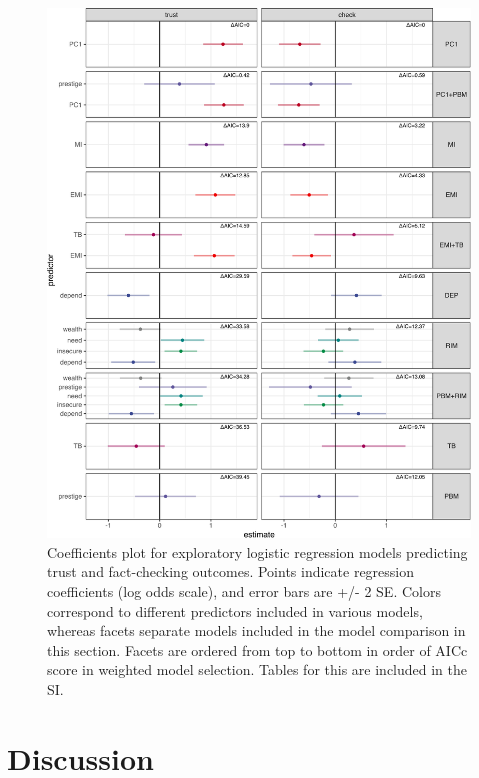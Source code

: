 \documentclass[
  11pt,
]{article}
\begin{document}
\begin{figure}
\centering
\includegraphics{trust-advice-writeup_files/figure-latex/single_coefficients_plot-1.pdf}
\caption{Coefficients plot for exploratory logistic regression models
predicting trust and fact-checking outcomes. Points indicate regression
coefficients (log odds scale), and error bars are +/- 2 SE. Colors
correspond to different predictors included in various models, whereas
facets separate models included in the model comparison in this section.
Facets are ordered from top to bottom in order of AICc score in weighted
model selection. Tables for this are included in the SI.}
\end{figure}

\newpage

\hypertarget{discussion}{%
\section{Discussion}\label{discussion}}
\end{document}
